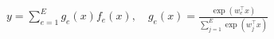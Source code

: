 $y=\sum_{e=1}^{E}g_e(x)f_e(x),\quad g_e(x)=\frac{\exp(w_e^{\top}x)}{\sum_{j=1}^{E}\exp(w_j^{\top}x)}$
